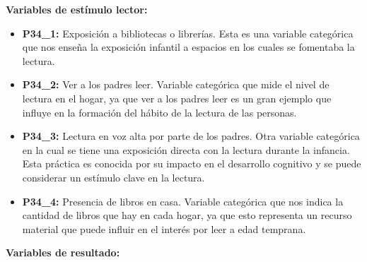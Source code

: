 \documentclass[aps,reprint]{revtex4-2}
\begin{document}
\textbf{Variables de estímulo lector:}

\begin{itemize}
    \item \textbf{P34\_1:} Exposición a bibliotecas o librerías. Esta es una variable categórica que nos enseña la exposición infantil a espacios en los cuales se fomentaba la lectura.

    \item \textbf{P34\_2:} Ver a los padres leer. Variable categórica que mide el nivel de lectura en el hogar, ya que ver a los padres leer es un gran ejemplo que influye en la formación del hábito de la lectura de las personas.

    \item \textbf{P34\_3:} Lectura en voz alta por parte de los padres. Otra variable categórica en la cual se tiene una exposición directa con la lectura durante la infancia. Esta práctica es conocida por su impacto en el desarrollo cognitivo y se puede considerar un estímulo clave en la lectura.

    \item \textbf{P34\_4:} Presencia de libros en casa. Variable categórica que nos indica la cantidad de libros que hay en cada hogar, ya que esto representa un recurso material que puede influir en el interés por leer a edad temprana.
\end{itemize}

\textbf{Variables de resultado:}
\end{document}

